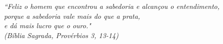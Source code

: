 \documentclass[
	12pt,				%
	oneside,
	a4paper,			%
	chapter=TITLE,
	english,			%
	brazil,				%
	]{abntex2}
\begin{document}

\frenchspacing 

\pretextual

\imprimircapa

\imprimirfolhaderosto




% 

\begin{epigrafe}
	\vspace*{\fill}
	\begin{flushright}
		\textit{``Feliz o homem que encontrou a sabedoria e alcançou o entendimento,\\
			porque a sabedoria vale mais do que a prata, \\
			e dá mais lucro que o ouro."\\
			(Bíblia Sagrada, Provérbios 3, 13-14)}
	\end{flushright}
\end{epigrafe}



\listoffigures*
\cleardoublepage

\listoftables*
\cleardoublepage

\end{document}
